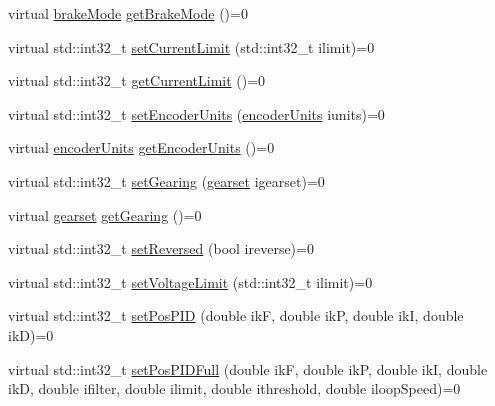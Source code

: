 \begin{DoxyCompactItemize}
\item 
virtual \mbox{\hyperlink{classokapi_1_1AbstractMotor_a132e0485dbb59a60c3f934338d8fa601}{brake\+Mode}} \mbox{\hyperlink{classokapi_1_1AbstractMotor_a157407c39c952a7c2eb497bddb868c93}{get\+Brake\+Mode}} ()=0
\item 
virtual std\+::int32\+\_\+t \mbox{\hyperlink{classokapi_1_1AbstractMotor_aec97c81f3d6604363ebc8ceaf425fe39}{set\+Current\+Limit}} (std\+::int32\+\_\+t ilimit)=0
\item 
virtual std\+::int32\+\_\+t \mbox{\hyperlink{classokapi_1_1AbstractMotor_ab83ef3319ffe1cb1d020e5a10127aab8}{get\+Current\+Limit}} ()=0
\item 
virtual std\+::int32\+\_\+t \mbox{\hyperlink{classokapi_1_1AbstractMotor_aae559b72399b0eb2124d969e40f97415}{set\+Encoder\+Units}} (\mbox{\hyperlink{classokapi_1_1AbstractMotor_ae811cd825099f2defadeb1b7f7e7764c}{encoder\+Units}} iunits)=0
\item 
virtual \mbox{\hyperlink{classokapi_1_1AbstractMotor_ae811cd825099f2defadeb1b7f7e7764c}{encoder\+Units}} \mbox{\hyperlink{classokapi_1_1AbstractMotor_ae8225381a81ca0b54469949a6022b775}{get\+Encoder\+Units}} ()=0
\item 
virtual std\+::int32\+\_\+t \mbox{\hyperlink{classokapi_1_1AbstractMotor_aba300f0e323cbdec60f1fee0f3197419}{set\+Gearing}} (\mbox{\hyperlink{classokapi_1_1AbstractMotor_a88aaa6ea2fa10f5520a537bbf26774d5}{gearset}} igearset)=0
\item 
virtual \mbox{\hyperlink{classokapi_1_1AbstractMotor_a88aaa6ea2fa10f5520a537bbf26774d5}{gearset}} \mbox{\hyperlink{classokapi_1_1AbstractMotor_adc90f1fc8af6c34c4e833355693474bb}{get\+Gearing}} ()=0
\item 
virtual std\+::int32\+\_\+t \mbox{\hyperlink{classokapi_1_1AbstractMotor_a72a6a4eb9d237ad57b92401b08ad64fa}{set\+Reversed}} (bool ireverse)=0
\item 
virtual std\+::int32\+\_\+t \mbox{\hyperlink{classokapi_1_1AbstractMotor_a2f33faf946b99cd34e9a591ccc33d644}{set\+Voltage\+Limit}} (std\+::int32\+\_\+t ilimit)=0
\item 
virtual std\+::int32\+\_\+t \mbox{\hyperlink{classokapi_1_1AbstractMotor_ad979f7591071947ab3aec693f3c73c03}{set\+Pos\+P\+ID}} (double ikF, double ikP, double ikI, double ikD)=0
\item 
virtual std\+::int32\+\_\+t \mbox{\hyperlink{classokapi_1_1AbstractMotor_aa440aaa9b5fa44e886a344e1e002485e}{set\+Pos\+P\+I\+D\+Full}} (double ikF, double ikP, double ikI, double ikD, double ifilter, double ilimit, double ithreshold, double iloop\+Speed)=0

\end{DoxyCompactItemize}
